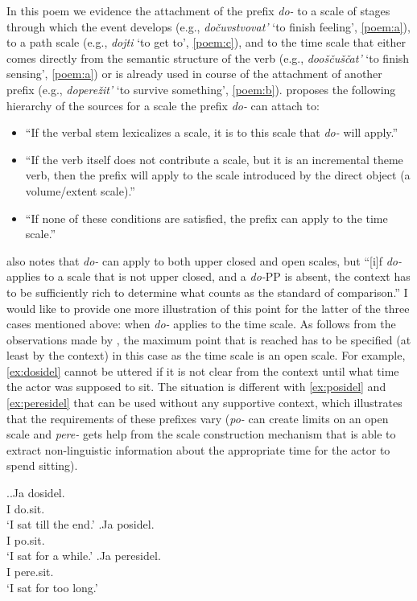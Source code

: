 In this poem we evidence the attachment of the prefix \textit{do-} to a scale of stages through which the event develops (e.g., \textit{do\v{c}uvstvovat'} `to finish feeling', \ref{poem:a}), to a path scale (e.g., \textit{dojti} `to get to', \ref{poem:c}), and to the time scale that either comes directly from the semantic structure of the verb (e.g., \textit{doo\v{s}\v{c}u\v{s}\v{c}at'} `to finish sensing', \ref{poem:a}) or is already used in course of the attachment of another prefix (e.g., \textit{dopere\v{z}it'} `to survive something', \ref{poem:b}). \citet{Kagan:book} proposes the following hierarchy of the sources for a scale the prefix \textit{do-} can attach to: 

\begin{itemize}
\item ``If the verbal stem lexicalizes a scale, it is to this scale that \textit{do-} will apply.''
\item ``If the verb itself does not contribute a scale, but it is an incremental
theme verb, then the prefix will apply to the scale introduced by the direct object (a volume/extent scale).''
\item ``If none of these conditions are satisfied, the prefix can apply to the time scale.''
\end{itemize}

\citet{Kagan:12} also notes that \textit{do-} can apply to both upper closed and open scales, but ``[i]f \textit{do-} applies to a scale that is not upper closed, and a \textit{do-}PP is absent, the context has to be sufficiently rich to determine what counts as the standard of comparison.'' I would like to provide one more illustration of this point for the latter of the three cases mentioned above: when \textit{do-} applies to the time scale. As follows from the observations made by \citet{Kagan:12}, the maximum point that is reached has to be specified (at least by the context) in this case as the time scale is an open scale. For example, \ref{ex:dosidel} cannot be uttered if it is not clear from the context until what time the actor was supposed to sit. The situation is different with \ref{ex:posidel} and \ref{ex:peresidel} that can be used without any supportive context, which illustrates that the requirements of these prefixes vary (\textit{po-} can create limits on an open scale and \textit{pere-} gets help from the scale construction mechanism that is able to extract non-linguistic information about the appropriate time for the actor to spend sitting).

\ex.\label{ex:dosidel}\ag.Ja dosidel.\\
I do.sit.\\
\trans `I sat till the end.'
\bg.\label{ex:posidel}Ja posidel.\\
I po.sit.\\
\trans `I sat for a while.'
\bg.\label{ex:peresidel}Ja peresidel.\\
I pere.sit.\\
\trans `I sat for too long.'

